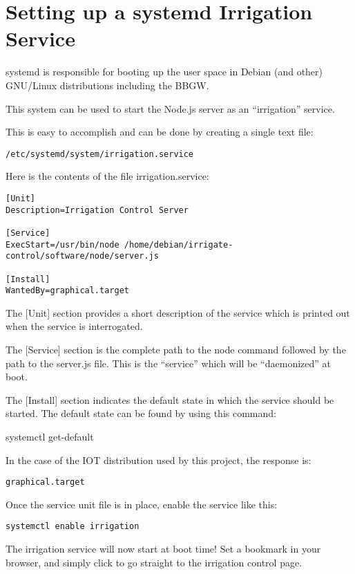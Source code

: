 \chapter{Setting up a systemd Irrigation Service}

systemd is responsible for booting up the user space in Debian (and other) 
GNU/Linux distributions including the BBGW.

This system can be used to start the Node.js server as an ``irrigation'' 
service.

This is easy to accomplish and can be done by creating a single text file:

\begin{verbatim}
/etc/systemd/system/irrigation.service
\end{verbatim}

Here is the contents of the file irrigation.service:

\begin{verbatim}
[Unit]
Description=Irrigation Control Server

[Service]
ExecStart=/usr/bin/node /home/debian/irrigate-control/software/node/server.js

[Install]
WantedBy=graphical.target
\end{verbatim}

The [Unit] section provides a short description of the service which is printed 
out when the service is interrogated.

The [Service] section is the complete path to the node command followed by the 
path to the server.js file.  This is the ``service'' which will be 
``daemonized'' at boot.

The [Install] section indicates the default state in which the service should 
be started.  The default state can be found by using this command:

systemctl get-default

In the case of the IOT distribution used by this project, the response is:

\begin{verbatim}
graphical.target
\end{verbatim}

Once the service unit file is in place, enable the service like this:

\begin{verbatim}
systemctl enable irrigation
\end{verbatim}

The irrigation service will now start at boot time!  Set a bookmark in your 
browser, and simply click to go straight to the irrigation control page.

